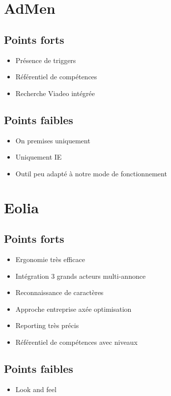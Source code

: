 \documentclass[12pt,twoside]{scrreprt}
\begin{document}
\section{AdMen}

\subsection{Points forts}
\begin{itemize}
	\item Présence de triggers
	\item Référentiel de compétences
	\item Recherche Viadeo intégrée
\end{itemize}
\subsection{Points faibles}
\begin{itemize}
	\item On premises uniquement
	\item Uniquement IE
	\item Outil peu adapté à notre mode de fonctionnement
\end{itemize}


\section{Eolia}
\subsection{Points forts}

\begin{itemize}
	\item Ergonomie très efficace
	\item Intégration 3 grands acteurs multi-annonce
	\item Reconnaissance de caractères
	\item Approche entreprise axée optimisation
	\item Reporting très précis
	\item Référentiel de compétences avec niveaux
\end{itemize}

\subsection{Points faibles}
\begin{itemize}
	\item Look and feel
\end{itemize}
\end{document}
